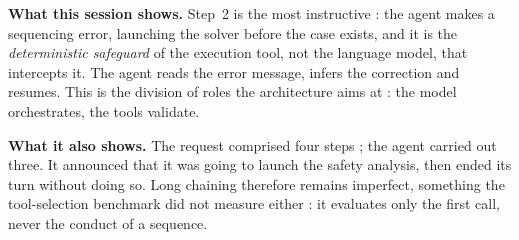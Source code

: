 \documentclass[12pt,a4paper]{report}
\begin{document}
\vspace{0.4cm}
\noindent
\textbf{What this session shows.} Step~2 is the most instructive : the agent
makes a sequencing error, launching the solver before the case exists, and
it is the \emph{deterministic safeguard} of the execution tool, not the language
model, that intercepts it. The agent reads the error message, infers the
correction and resumes. This is the division of roles the architecture
aims at : the model orchestrates, the tools validate.

\vspace{0.3cm}
\noindent
\textbf{What it also shows.} The request comprised four steps ; the agent carried
out three. It announced that it was going to launch the safety analysis, then
ended its turn without doing so. Long chaining therefore remains imperfect,
something the tool-selection benchmark did not measure either : it evaluates only
the first call, never the conduct of a sequence.
\end{document}
